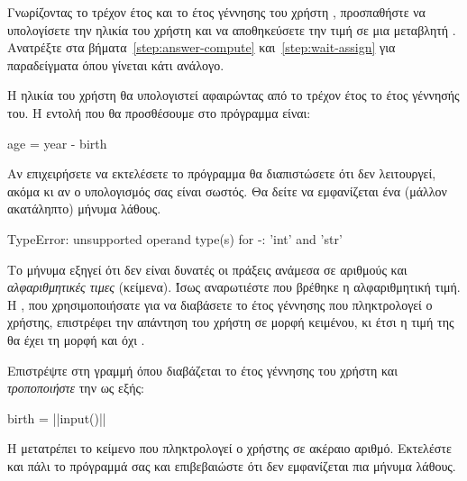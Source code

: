 \documentclass[a4paper,11pt,oneside]{book}
\begin{document}
\begin{step}
Γνωρίζοντας το τρέχον έτος  και το έτος γέννησης του χρήστη , προσπαθήστε να υπολογίσετε την ηλικία του χρήστη και να αποθηκεύσετε την τιμή σε μια μεταβλητή . Aνατρέξτε στα βήματα~\ref{step:answer-compute} και~\ref{step:wait-assign} για παραδείγματα όπου γίνεται κάτι ανάλογο. 

\begin{answer}
Η ηλικία του χρήστη θα υπολογιστεί αφαιρώντας από το τρέχον έτος το έτος γέννησής του. Η εντολή που θα προσθέσουμε στο πρόγραμμα είναι:

\begin{pynew}
age = year - birth
\end{pynew}
\end{answer}

\marginnote[18pt]{\iconcaution}
Αν επιχειρήσετε να εκτελέσετε το πρόγραμμα θα διαπιστώσετε ότι δεν λειτουργεί, ακόμα κι αν ο υπολογισμός σας είναι σωστός. Θα δείτε να εμφανίζεται ένα (μάλλον ακατάληπτο) μήνυμα λάθους.
 
\begin{pyterm}
TypeError: unsupported operand type(s) for -:
  'int' and 'str'
\end{pyterm}

Το μήνυμα εξηγεί ότι δεν είναι δυνατές οι πράξεις ανάμεσα σε αριθμούς και \emph{αλφαριθμητικές τιμες} (κείμενα). Ίσως αναρωτιέστε που βρέθηκε η αλφαριθμητική τιμή. Η , που χρησιμοποιήσατε για να διαβάσετε το έτος γέννησης που πληκτρολογεί ο χρήστης, επιστρέφει την απάντηση του χρήστη σε μορφή κειμένου, κι έτσι η τιμή της  θα έχει τη μορφή  και όχι .
\end{step}

\begin{step}
Επιστρέψτε στη γραμμή όπου διαβάζεται το έτος γέννησης του χρήστη και \emph{τροποποιήστε} την ως εξής:

\begin{pyplain}
birth = ||input()|\pyhighlight{)}|
\end{pyplain}

H  μετατρέπει το κείμενο που πληκτρολογεί ο χρήστης σε ακέραιο αριθμό. Εκτελέστε και πάλι το πρόγραμμά σας και επιβεβαιώστε ότι δεν εμφανίζεται πια μήνυμα λάθους.
\end{step}
\end{document}
